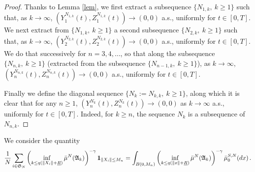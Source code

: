 \documentclass[notitlepage,reqno,11pt]{amsart}
\numberwithin{equation}{section}
\begin{document}
\begin{proof}
Thanks to Lemma \ref{lem}, we  first extract a subsequence $\{N_{1,k},\ k\ge1\}$ such that, as $k\to\infty$, $(Y^{N_{1,k}}_1(t),Z^{N_{1,k}}_1(t))\to(0,0)$ a.s., uniformly for $t\in[0,T]$.
We next extract from $\{N_{1,k},\ k\ge1\}$ a second subsequence $\{N_{2,k},\ k\ge1\}$ such that, as $k\to\infty$, $(Y^{N_{2,k}}_2(t),Z^{N_{2,k}}_2(t))\to(0,0)$  a.s., uniformly for $t\in[0,T]$. We do that successively for $n=3, 4,\ldots$, so that along the subsequence $\{N_{n,k},\ k\ge1\}$
(extracted from the subsequence $\{N_{n-1,k},\ k\ge1\}$), as $k\to\infty$, $(Y^{N_{n,k}}_n(t),Z^{N_{n,k}}_n(t))\to(0,0)$  a.s., uniformly for $t\in[0,T]$.

Finally we define the diagonal sequence $\{N_k:=N_{k,k},\ k\ge1\}$, along which it is clear that for any $n\ge1$, $(Y^{N_k}_n(t),Z^{N_k}_n(t))\to(0,0)$ as $k\to\infty$ a.s., uniformly for $t\in[0,T]$. Indeed, for $k\ge n$, the sequence $N_k$ is a subsequence of $N_{n,k}$.
\end{proof}
\bigskip


We consider the quantity
\[\frac{1}{N}\sum_{i\in\mathfrak{S}_N}\left(\inf_{k\le q(\|X_i\|+\underline{R})}\bar{\mu}^N(\mathfrak{A}_k)\right)^{-\gamma}
{\bf1}_{\|X_i\|\le M_n}=\int_{B(0,M_n)}\left(\inf_{k\le q(\|x\|+\underline{R})}\bar{\mu}^N(\mathfrak{A}_k)\right)^{-\gamma}\bar{\mu}^{S,N}_{0}(dx)\,.\]
\end{document}
